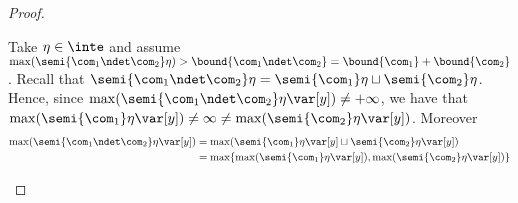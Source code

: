 \begin{proof}
\begin{inductive}
    
    
    
    
    
    
    
    Take \(\eta \in \inte\) and assume
    \(\max(\semi{\com_1 \ndet \com_2}\eta) > \bound{\com_1 \ndet \com_2}
    = \bound{\com_1} + \bound{\com_2}\).  Recall that
    \(\semi{\com_1 \ndet \com_2} \eta = \semi{\com_1}\eta \sqcup
    \semi{\com_2}\eta\).
    Hence, since
    \(\max(\semi{\com_1 \ndet \com_2} \eta \var[y]) \neq +\infty\), we
    have that
    \(\max(\semi{\com_1} \eta \var[y]) \neq \infty \neq
    \max(\semi{\com_2}\eta \var[y])\).  Moreover
    \begin{align*}
      \max(\semi{\com_1 \ndet \com_2}\eta \var[y])& =  \max(\semi{\com_1}\eta \var[y] \sqcup \semi{\com_2}\eta \var[y]) \\ 
                                                  & = \max \{ \max(\semi{\com_1}\eta \var[y]), \max(\semi{\com_2}\eta \var[y])\} %
    \end{align*}


\end{inductive}
\end{proof}
